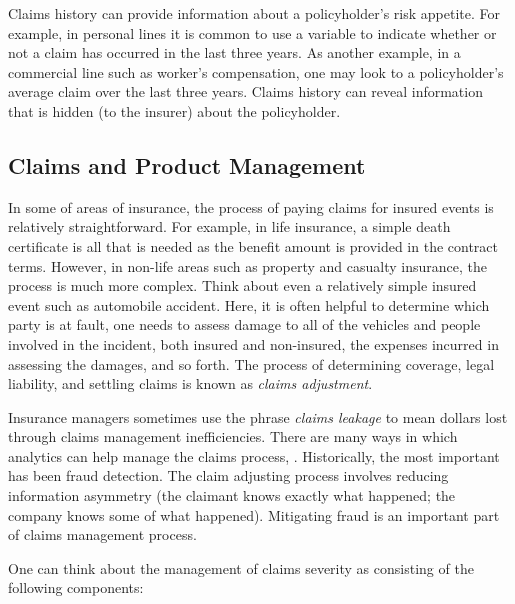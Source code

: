 \documentclass[]{book}
\theoremstyle{definition}
\theoremstyle{definition}
\theoremstyle{definition}
\theoremstyle{remark}
\begin{document}
Claims history can provide information about a policyholder's risk
appetite. For example, in personal lines it is common to use a variable
to indicate whether or not a claim has occurred in the last three years.
As another example, in a commercial line such as worker's compensation,
one may look to a policyholder's average claim over the last three
years. Claims history can reveal information that is hidden (to the
insurer) about the policyholder.

\subsection{Claims and Product
Management}\label{claims-and-product-management}

In some of areas of insurance, the process of paying claims for insured
events is relatively straightforward. For example, in life insurance, a
simple death certificate is all that is needed as the benefit amount is
provided in the contract terms. However, in non-life areas such as
property and casualty insurance, the process is much more complex. Think
about even a relatively simple insured event such as automobile
accident. Here, it is often helpful to determine which party is at
fault, one needs to assess damage to all of the vehicles and people
involved in the incident, both insured and non-insured, the expenses
incurred in assessing the damages, and so forth. The process of
determining coverage, legal liability, and settling claims is known as
\emph{claims adjustment}.

Insurance managers sometimes use the phrase \emph{claims leakage} to
mean dollars lost through claims management inefficiencies. There are
many ways in which analytics can help manage the claims process,
\citep{SASsurvey}. Historically, the most important has been fraud
detection. The claim adjusting process involves reducing information
asymmetry (the claimant knows exactly what happened; the company knows
some of what happened). Mitigating fraud is an important part of claims
management process.

One can think about the management of claims severity as consisting of
the following components:
\end{document}
